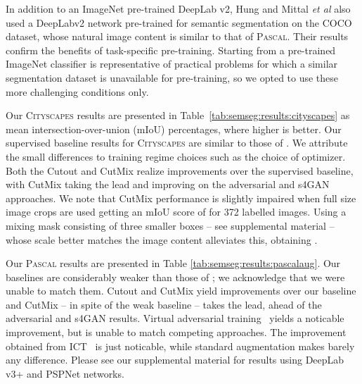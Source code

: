 \documentclass{bmvc2k}
\def\etal{\emph{et al}\bmvaOneDot}
\newcommand{\Cityscapes}{\textsc{Cityscapes}}
\newcommand{\Pascal}{\textsc{Pascal}}
\newcommand{\CoCo}{\textsc{COCO}}
\begin{document}
In addition to an ImageNet pre-trained DeepLab v2, Hung \cite{Hung:AdvSemiSupSeg} and Mittal \etal\cite{Mittal:SSSHiLow}
also used a DeepLabv2 network pre-trained for semantic segmentation on the \CoCo{} dataset, whose natural image content is similar to that of \Pascal{}.
Their results confirm the benefits of task-specific pre-training.
Starting from a pre-trained ImageNet classifier is representative of practical problems for which a similar segmentation dataset is unavailable for pre-training,
so we opted to use these more challenging conditions only.

Our \Cityscapes{} results are presented in Table~\ref{tab:semseg:results:cityscapes} as mean intersection-over-union (mIoU) percentages, where higher is better.
Our supervised baseline results for \Cityscapes{} are similar to those of \cite{Mittal:SSSHiLow}. We attribute the small differences to training regime choices such as the choice of optimizer.
Both the Cutout and CutMix realize improvements over the supervised baseline, with CutMix taking the lead and improving on the adversarial\cite{Hung:AdvSemiSupSeg} and s4GAN\cite{Mittal:SSSHiLow} approaches.
We note that CutMix performance is slightly impaired when full size image crops are used getting an mIoU score of  for 372 labelled images.
Using a mixing mask consisting of three smaller boxes -- see supplemental material -- whose scale better matches the image content alleviates this, obtaining .

Our \Pascal{} results are presented in Table \ref{tab:semseg:results:pascalaug}.
Our baselines are considerably weaker than those of \cite{Mittal:SSSHiLow}; we acknowledge that we were unable to match them.
Cutout and CutMix yield improvements over our baseline and CutMix -- in spite of the weak baseline -- takes the lead, ahead of the adversarial and s4GAN results.
Virtual adversarial training~\cite{Miyato:VATSemiSup} yields a noticable improvement, but is unable to match competing approaches.
The improvement obtained from ICT~\cite{Verma:ICT} is just noticable, while standard augmentation makes barely any difference.
Please see our supplemental material for results using DeepLab v3+ \cite{Chen:DeepLabv3plus} and PSPNet \cite{Zhao:PSPNet} networks.
\end{document}
